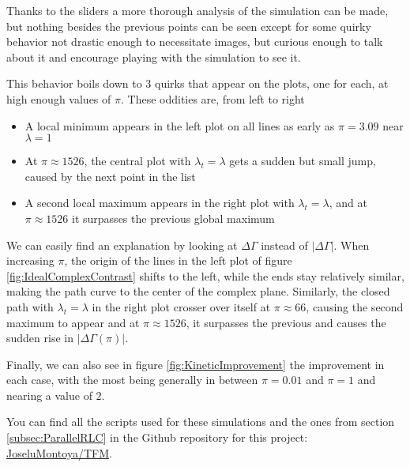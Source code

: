 \documentclass[../main.tex]{subfiles}
\begin{document}
Thanks to the sliders a more thorough analysis of the simulation can be made,
but nothing besides the previous points can be seen except for some
quirky behavior not drastic enough to necessitate images, but curious enough
to talk about it and encourage playing with the simulation to see it.

This behavior boils down to 3 quirks that appear on the plots, one for each, at
high enough values of \(\pi\). These oddities are, from left to right

\begin{itemize}
    \item A local minimum appears in the left plot on all lines as early as
        \(\pi = 3.09\) near \(\lambda = 1\)
    \item At \(\pi \approx 1526\), the central plot with \(\lambda_{t} = \lambda\)
        gets a sudden but small jump, caused by the next point in the list
    \item A second local maximum appears in the right plot with
        \(\lambda_{t} = \lambda\), and at \(\pi \approx 1526\) it surpasses the
        previous global maximum
\end{itemize}

We can easily find an explanation by looking at \(\Delta\Gamma\) instead of
\(|\Delta\Gamma|\). When increasing \(\pi\), the origin of the lines in the
left plot of figure \ref{fig:IdealComplexContrast} shifts to the left, while
the ends stay relatively similar, making the path curve to the center of the
complex plane. Similarly, the closed path with \(\lambda_{t} = \lambda\)
in the right plot crosser over itself at \(\pi \approx 66\), causing the
second maximum to appear and at \(\pi \approx 1526\), it surpasses the previous
and causes the sudden rise in \(|\Delta\Gamma(\pi)|\).

Finally, we can also see in figure \ref{fig:KineticImprovement} the improvement
in each case, with the most being generally in between \(\pi = 0.01\) and
\(\pi = 1\) and nearing a value of \(2\).

You can find all the scripts used for these simulations and the ones from
section \ref{subsec:ParallelRLC} in the Github repository for this project:
\href{https://github.com/JoseluMontoya/TFM}{JoseluMontoya/TFM}.
\end{document}
